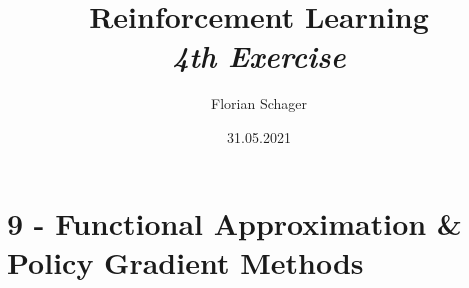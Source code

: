 \documentclass{article}
\title
{
  Reinforcement Learning \\
  \vspace{4pt}
  \normalsize
  \textit{4th Exercise}
}
\author
{
  Florian Schager
}
\date{31.05.2021}
\begin{document}
\maketitle

\section*{9 - Functional Approximation \& Policy Gradient Methods}










\end{document}
